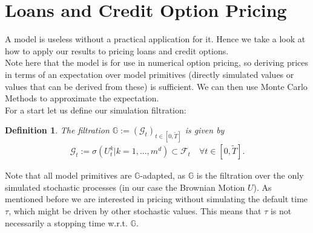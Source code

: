 \documentclass[12pt]{article}
\newtheorem{definition}[theorem]{Definition}
\begin{document}
	
	\pagebreak
	\section{Loans and Credit Option Pricing}
	A model is useless without a practical application for it. Hence we take a look at how to apply our results to pricing loans and credit options.\\
	Note here that the model is for use in numerical option pricing, so deriving prices in terms of an expectation over model primitives (directly simulated values or values that can be derived from these) is sufficient. We can then use Monte Carlo Methods to approximate the expectation.\\
	For a start let us define our simulation filtration:
	\begin{definition}
		The filtration $\mathbb{G} := (\mathcal{G}_t)_{t\in\left[0,\tilde{T}\right]}$ is given by
		\begin{align*}
			\mathcal{G}_t := \sigma(U^k_t | k = 1, ..., m^d) \subset \mathcal{F}_t \quad \forall t \in  [0,\tilde{T}].
		\end{align*}
	\end{definition}
	Note that all model primitives are $\mathbb{G}$-adapted, as $\mathbb{G}$ is the filtration over the only simulated stochastic processes (in our case the Brownian Motion $U$). As mentioned before we are interested in pricing without simulating the default time $\tau$, which might be driven by other stochastic values. This means that $\tau$ is not necessarily a stopping time w.r.t. $\mathbb{G}$.
	
\end{document}
